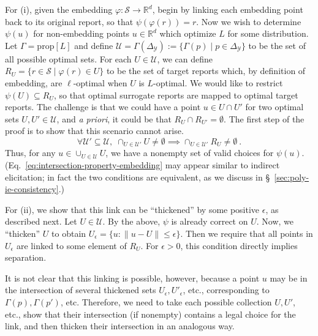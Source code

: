\documentclass[twoside,11pt]{article}
\newcommand{\reals}{\mathbb{R}}
\newcommand{\prop}[1]{\mathrm{prop}[#1]}
\newcommand{\simplex}{\Delta_\Y}
\newcommand{\Sc}{\mathcal{S}}
\newcommand{\U}{\mathcal{U}}
\newcommand{\Y}{\mathcal{Y}}
\begin{document}
For (i), given the embedding $\varphi: \Sc\to\reals^d$, begin by linking each embedding point back to its original report, so that $\psi(\varphi(r)) = r$.
Now we wish to determine $\psi(u)$ for non-embedding points $u\in\reals^d$ which optimize $L$ for some distribution.
Let $\Gamma = \prop L$ and define $\U = \Gamma(\simplex) := \{\Gamma(p) \mid p\in\simplex\}$ to be the set of all possible optimal sets.
For each $U\in\U$, we can define $R_U = \{ r\in\Sc \mid \varphi(r) \in U\}$ to be the set of target reports which, by definition of embedding, are $\ell$-optimal when $U$ is $L$-optimal.
We would like to restrict $\psi(U) \subseteq R_U$, so that optimal surrogate reports are mapped to optimal target reports.
The challenge is that we could have a point $u\in U\cap U'$ for two optimal sets $U,U'\in\U$, and \emph{a priori}, it could be that $R_U \cap R_{U'} = \emptyset$.
The first step of the proof is to show that this scenario cannot arise.
\begin{equation}
  \label{eq:intersection-property-embedding}
  \forall \U'\subseteq\U, \; \cap_{U\in\U'} U \neq \emptyset \implies \cap_{U\in\U'} R_U \neq \emptyset~.
\end{equation}
\noindent
Thus, for any $u\in\cup_{U \in \U}U$, we have a nonempty set of valid choices for $\psi(u)$.
(Eq.~\eqref{eq:intersection-property-embedding} may appear similar to indirect elicitation; in fact the two conditions are equivalent, as we discuss in \S~\ref{sec:poly-ie-consistency}.)

For (ii), we show that this link can be ``thickened'' by some positive $\epsilon$, as described next.
Let $U\in\U$.
By the above, $\psi$ is already correct on $U$.
Now, we ``thicken'' $U$ to obtain $U_{\epsilon} = \{u : \|u - U\| \leq \epsilon\}$.
Then we require that all points in $U_{\epsilon}$ are linked to some element of $R_U$.
For $\epsilon > 0$, this condition directly implies separation.

It is not clear that this linking is possible, however, because a point $u$ may be in the intersection of several thickened sets $U_{\epsilon}, U'_{\epsilon}$, etc., corresponding to $\Gamma(p), \Gamma(p')$, etc.
Therefore, we need to take each possible collection $U,U'$, etc., show that their intersection (if nonempty) contains a legal choice for the link, and then thicken their intersection in an analogous way.
\end{document}
